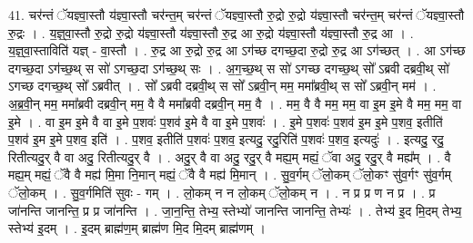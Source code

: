 \documentclass[17pt]{extarticle}
\begin{document}
41. चर॑न्तं ॅयज्ञ्वा॒स्तौ य॑ज्ञ्वा॒स्तौ चर॑न्त॒म् चर॑न्तं ॅयज्ञ्वा॒स्तौ रु॒द्रो रु॒द्रो य॑ज्ञ्वा॒स्तौ चर॑न्त॒म् चर॑न्तं ॅयज्ञ्वा॒स्तौ रु॒द्रः । . य॒ज्ञ्॒वा॒स्तौ रु॒द्रो रु॒द्रो य॑ज्ञ्वा॒स्तौ य॑ज्ञ्वा॒स्तौ रु॒द्र आ रु॒द्रो य॑ज्ञ्वा॒स्तौ य॑ज्ञ्वा॒स्तौ रु॒द्र आ । . य॒ज्ञ्॒वा॒स्ताविति॑ यज्ञ् - वा॒स्तौ । . रु॒द्र आ रु॒द्रो रु॒द्र आ ऽग॑च्छ दगच्छ॒दा रु॒द्रो रु॒द्र आ ऽग॑च्छत् । . आ ऽग॑च्छ दगच्छ॒दा ऽग॑च्छ॒थ् स सो॑ ऽगच्छ॒दा ऽग॑च्छ॒थ् सः । . अ॒ग॒च्छ॒थ् स सो॑ ऽगच्छ दगच्छ॒थ् सो᳚ ऽब्रवी दब्रवी॒थ् सो॑ ऽगच्छ दगच्छ॒थ् सो᳚ ऽब्रवीत् । . सो᳚ ऽब्रवी दब्रवी॒थ् स सो᳚ ऽब्रवी॒न् मम॒ ममा᳚ब्रवी॒थ् स सो᳚ ऽब्रवी॒न् मम॑ । . अ॒ब्र॒वी॒न् मम॒ ममा᳚ब्रवी दब्रवी॒न् मम॒ वै वै ममा᳚ब्रवी दब्रवी॒न् मम॒ वै । . मम॒ वै वै मम॒ मम॒ वा इ॒म इ॒मे वै मम॒ मम॒ वा इ॒मे । . वा इ॒म इ॒मे वै वा इ॒मे प॒शवः॑ प॒शव॑ इ॒मे वै वा इ॒मे प॒शवः॑ । . इ॒मे प॒शवः॑ प॒शव॑ इ॒म इ॒मे प॒शव॒ इतीति॑ प॒शव॑ इ॒म इ॒मे प॒शव॒ इति॑ । . प॒शव॒ इतीति॑ प॒शवः॑ प॒शव॒ इत्यदु॒ रदु॒रिति॑ प॒शवः॑ प॒शव॒ इत्यदुः॑ । . इत्यदु॒ रदु॒ रितीत्यदु॒र् वै वा अदु॒ रितीत्यदु॒र् वै । . अदु॒र् वै वा अदु॒ रदु॒र् वै मह्य॒म् मह्यं॒ ॅवा अदु॒ रदु॒र् वै मह्य᳚म् । . वै मह्य॒म् मह्यं॒ ॅवै वै मह्य॑ मि॒मा नि॒मान् मह्यं॒ ॅवै वै मह्य॑ मि॒मान् । . सु॒व॒र्गम् ॅलो॒कम् ॅलो॒कꣳ सु॑व॒र्गꣳ सु॑व॒र्गम् ॅलो॒कम् । . सु॒व॒र्गमिति॑ सुवः - गम् । . लो॒कम् न न लो॒कम् ॅलो॒कम् न । . न प्र प्र ण न प्र । . प्र जा॑नन्ति जानन्ति॒ प्र प्र जा॑नन्ति । . जा॒न॒न्ति॒ तेभ्य॒ स्तेभ्यो॑ जानन्ति जानन्ति॒ तेभ्यः॑ । . तेभ्य॑ इ॒द मि॒दम् तेभ्य॒ स्तेभ्य॑ इ॒दम् । . इ॒दम् ब्राह्म॑ण॒म् ब्राह्म॑ण मि॒द मि॒दम् ब्राह्म॑णम् । \newline
\end{document}
